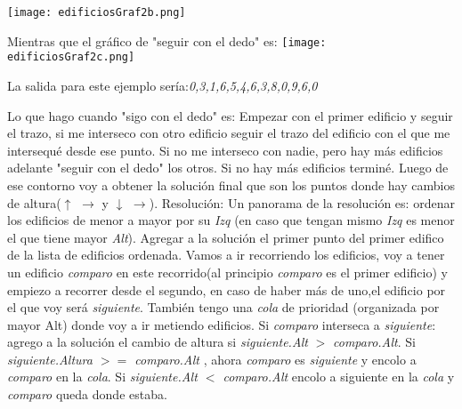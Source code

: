 \documentclass{article}
\begin{document}
\texttt{[image: edificiosGraf2b.png]}
\begin {flushleft}
\end{flushleft}
\newpage
Mientras que el gr\'afico de "seguir con el dedo" es: \newline
\texttt{[image: edificiosGraf2c.png]}
\begin {flushleft}
La salida para este ejemplo sería:\newline \textit{{0,3,1,6,5,4,6,3,8,0,9,6,0}}
\end{flushleft}
Lo que hago cuando "sigo con el dedo" es: \newline
Empezar con el primer edificio y seguir el trazo, si me interseco con otro edificio seguir el trazo del edificio con el que me intersequ\'e desde ese punto. \newline
Si no me interseco con nadie, pero hay m\'as edificios adelante "seguir con el dedo" los otros. Si no hay más edificios termin\'e.\newline
Luego de ese contorno voy a obtener la soluci\'on final que son los puntos donde hay cambios de altura($\uparrow$ $\longrightarrow$ y $\downarrow$ $\longrightarrow$). \newline
\newpage
{\noindent \Huge Resoluci\'on:}
\newline \newline
Un panorama de la resolución es:\newline
ordenar los edificios de menor a mayor por su \textit{Izq} (en caso que tengan mismo \textit{Izq} es menor el que tiene mayor \textit{Alt}). \newline
Agregar a la solución el primer punto del primer edifico de la lista de edificios ordenada. \newline
Vamos a ir recorriendo los edificios, voy a tener un edificio \textit{comparo} en este recorrido(al principio \textit{comparo} es el primer edificio) y empiezo a recorrer desde el segundo, en caso de haber más de uno,el edificio por el que voy será \textit{siguiente}. También tengo una \textit{cola} de prioridad (organizada por mayor Alt) donde voy a ir metiendo edificios.\newline
Si \textit{comparo} interseca a \textit{siguiente}:\newline
agrego a la solución el cambio de altura si \textit{siguiente.Alt} $>$ \textit{comparo.Alt}.\newline
Si \textit{siguiente.Altura $>=$ comparo.Alt} , ahora \textit{comparo} es \textit{siguiente} y encolo a \textit{comparo} en la \textit{cola}.\newline
Si \textit{siguiente.Alt $<$ comparo.Alt} encolo a siguiente en la \textit{cola} y \textit{comparo} queda donde estaba.\newline
 
\end{document}
